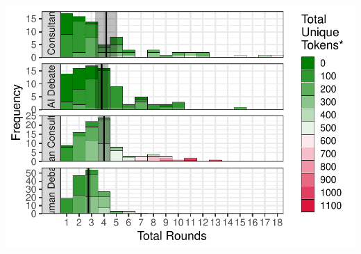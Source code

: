 \documentclass[
]{article}
\begin{document}
\includegraphics[width=1\linewidth]{debate-2309_files/figure-latex/rounds graph-3}
\end{document}

